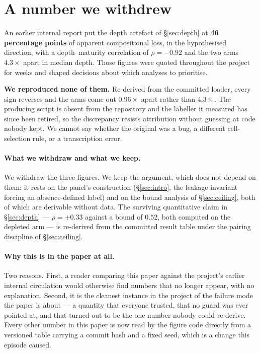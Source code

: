 %
%

\section{A number we withdrew}
\label{app:withdrawn}

An earlier internal report put the depth artefact of \S\ref{sec:depth} at
\textbf{46 percentage points} of apparent compositional loss, in the hypothesised
direction, with a depth--maturity correlation of $\rho = -0.92$ and the two arms
$4.3\times$ apart in median depth. Those figures were quoted throughout the
project for weeks and shaped decisions about which analyses to prioritise.

\textbf{We reproduced none of them.} Re-derived from the committed loader, every
sign reverses and the arms come out $0.96\times$ apart rather than $4.3\times$.
The producing script is absent from the repository and the labeller it measured
has since been retired, so the discrepancy resists attribution without guessing
at code nobody kept. We cannot say whether the original was a bug, a different
cell-selection rule, or a transcription error.

\paragraph{What we withdraw and what we keep.} We withdraw the three figures. We
keep the argument, which does not depend on them: it rests on the panel's
construction (\S\ref{sec:intro}, the leakage invariant forcing an
absence-defined label) and on the bound analysis of \S\ref{sec:ceiling}, both of
which are derivable without data. The surviving quantitative claim in
\S\ref{sec:depth} --- $\rho = +0.33$ against a bound of $0.52$, both computed on
the depleted arm --- is re-derived from the committed result table under the
pairing discipline of \S\ref{sec:ceiling}.

\paragraph{Why this is in the paper at all.} Two reasons. First, a reader
comparing this paper against the project's earlier internal circulation would
otherwise find numbers that no longer appear, with no explanation. Second, it is
the cleanest instance in the project of the failure mode the paper is about ---
a quantity that everyone trusted, that no guard was ever pointed at, and that
turned out to be the one number nobody could re-derive. Every other number in
this paper is now read by the figure code directly from a versioned table
carrying a commit hash and a fixed seed, which is a change this episode caused.

